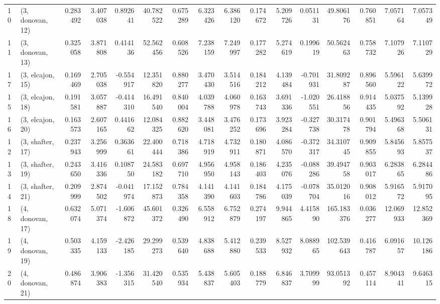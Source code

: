 \begin{tabular}{llrrrrrrrrrrrrrr}
10 &  (3, donovan, 12) &   0.283492 &  3.407038 &  0.892641 &  40.782522 &  0.675289 &   6.323426 &  6.386120 &  0.174672 &  5.209726 &  0.051131 &   49.806176 &  0.760851 &   7.057164 &   7.057349 \\
11 &  (3, donovan, 13) &   0.325058 &  3.871808 &  0.414136 &  52.562456 &  0.608526 &   7.238159 &  7.249997 &  0.177282 &  5.274619 &  0.199619 &   50.562463 &  0.758732 &   7.107926 &   7.110729 \\
17 &  (3, elcajon, 15) &   0.169469 &  2.705038 & -0.554917 &  12.351820 &  0.880277 &   3.470430 &  3.514516 &  0.184212 &  4.139484 & -0.701931 &   31.809287 &  0.896560 &   5.596122 &   5.639972 \\
15 &  (3, elcajon, 18) &   0.191581 &  3.057887 & -0.414310 &  16.491540 &  0.840004 &   4.039788 &  4.060978 &  0.163743 &  3.691336 & -1.020551 &   26.418856 &  0.914435 &   5.037592 &   5.139928 \\
16 &  (3, elcajon, 20) &   0.163573 &  2.607165 &  0.441662 &  12.084325 &  0.882620 &   3.448081 &  3.476252 &  0.173696 &  3.923284 & -0.327738 &   30.317478 &  0.901794 &   5.496368 &   5.506131 \\
12 &  (3, shafter, 17) &   0.237943 &  3.256999 &  0.363661 &  22.400444 &  0.718386 &   4.718919 &  4.732911 &  0.180871 &  4.086570 & -0.372317 &   34.310745 &  0.909855 &   5.845693 &   5.857537 \\
13 &  (3, shafter, 19) &   0.243650 &  3.416336 &  0.108750 &  24.583182 &  0.697710 &   4.956950 &  4.958143 &  0.186403 &  4.235076 & -0.088286 &   39.494758 &  0.903017 &   6.283865 &   6.284486 \\
14 &  (3, shafter, 21) &   0.209999 &  2.874502 & -0.041974 &  17.152873 &  0.784358 &   4.141390 &  4.141603 &  0.184786 &  4.175039 & -0.078704 &   35.012016 &  0.908012 &   5.916572 &   5.917095 \\
18 &  (4, donovan, 17) &   0.632074 &  5.071374 & -1.606872 &  45.601372 &  0.326490 &   6.558912 &  6.752879 &  0.274197 &  9.944865 &  4.415890 &  165.183376 &  0.036277 &  12.069933 &  12.852369 \\
19 &  (4, donovan, 19) &   0.503335 &  4.159133 & -2.426185 &  29.299273 &  0.539640 &   4.838688 &  5.412880 &  0.239533 &  8.527932 &  8.088965 &  102.539643 &  0.416787 &   6.091657 &  10.126186 \\
20 &  (4, donovan, 21) &   0.486874 &  3.906383 & -1.356315 &  31.420540 &  0.535934 &   5.438837 &  5.605403 &  0.188779 &  6.846837 &  3.709999 &   93.051392 &  0.457114 &   8.904341 &   9.646315 \\

\end{tabular}
